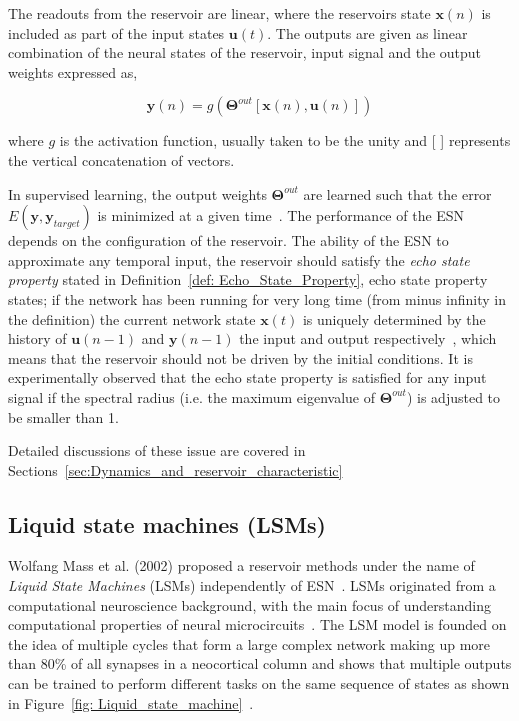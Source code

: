 \documentclass{WitsPhysicsReport}
\begin{document}
 
The readouts from the reservoir are linear, where the reservoirs state $\mathbf{x}(n)$ is included as part of the input states $\mathbf{u}(t)$. The outputs are given as linear combination of the neural states of the reservoir, input signal and the output weights expressed as,
 
\begin{equation}
\mathbf{y}(n) = g({\mathbf{\Theta}}^{out}[\textbf{x}(n),\textbf{u}(n)])
\label{equ:output_state}
\end{equation}
 
 
where $g$ is the activation function, usually taken to be the unity and [  ] represents the vertical concatenation of vectors.
 
In supervised learning, the output weights $\mathbf{\Theta}^{out}$ are learned such that the error $E(\mathbf{y}, \mathbf{y}_{target})$ is minimized at a given time~\cite{lukovsevivcius2009reservoir}. The performance of the ESN depends on the configuration of the reservoir. The ability of the ESN to approximate any temporal input, the reservoir should satisfy the \textit{echo state property} stated in Definition~\ref{def: Echo_State_Property}, echo state property states; if the network has been running for very long time (from minus infinity in the definition) the current network state $\mathbf{x}(t)$ is uniquely determined by the history of $\mathbf{u}(n-1)$ and $\mathbf{y}(n-1)$ the input and output respectively~\cite{jaeger2001echo}, which means that the reservoir should not be driven by the initial conditions. It is experimentally observed that the echo state property is satisfied for any input signal if the spectral radius (i.e. the maximum eigenvalue of $\mathbf{\Theta}^{out}$) is adjusted to be smaller than 1.



Detailed discussions of these issue are covered in Sections~\ref{sec:Dynamics_and_reservoir_characteristic}


\subsection{Liquid state machines (LSMs)}
\label{sec:Liquid_State_Machines}

Wolfang Mass et al. (2002)  proposed a reservoir methods under the name of \textit{Liquid State Machines} (LSMs) independently of ESN~\cite{maass2002real}. LSMs originated from a computational neuroscience background, with the main focus of understanding computational properties of neural microcircuits~\cite{Maass:2002:MRC:2968618.2968647,maass2002real,maass2004computational,natschlager2003computer}. The LSM model is founded on the idea of  multiple cycles that form a large complex network making up more than 80\% of all synapses in a neocortical column and shows that multiple outputs can be trained to perform different tasks on the same sequence of states as shown in Figure~\ref{fig: Liquid_state_machine}~\cite{Schaetti2015}.
\end{document}
